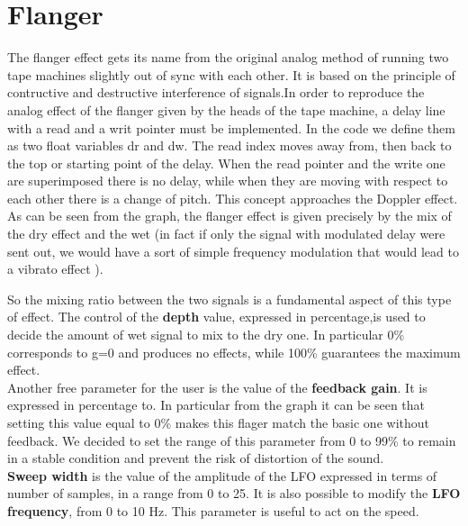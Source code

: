 \section{Flanger}
The flanger effect gets its name from the original analog method of running two tape machines slightly out of sync with each other. It is based on the principle of contructive and destructive interference of signals.In order to reproduce the analog effect of the flanger given by the heads of the tape machine, a delay line with a read and a writ pointer must be implemented. In the code we define them as two float variables dr and dw. The read index moves away from, then back to the top or starting point of the delay. When the read pointer and the write one are superimposed there is no delay, while when they are moving with respect to each other there is a change of pitch. This concept approaches the Doppler effect. As can be seen from the graph, the flanger effect is given precisely by the mix of the dry effect and the wet (in fact if only the signal with modulated delay were sent out, we would have a sort of simple frequency modulation that would lead to a vibrato effect ).\par
So the mixing ratio between the two signals is a fundamental aspect of this type of effect. The control of the \textbf{depth} value, expressed in percentage,is used to decide the amount of wet signal to mix to the dry one. In particular 0\% corresponds to g=0 and produces no effects, while 100\% guarantees the maximum effect.\\
Another free parameter for the user is the value of the \textbf{feedback gain}. It is expressed in percentage to. In particular from the graph it can be seen that setting this value equal to 0\% makes this flager match the basic one without feedback. We decided to set the range of this parameter from 0 to 99\% to remain in a stable condition and prevent the risk of distortion of the sound.\\
\textbf{Sweep width} is the value of the amplitude of the LFO expressed in terms of number of samples, in a range from  0 to 25. It is also possible to modify the \textbf{LFO frequency}, from 0 to 10 Hz. This parameter is useful to act on the speed.





